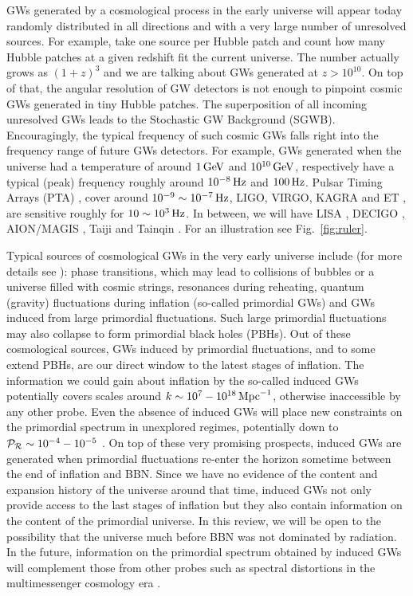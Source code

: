 \documentclass[a4paper,11pt]{article}
\numberwithin{equation}{section}
\begin{document}
GWs generated by a cosmological process in the early universe will appear today randomly distributed in all directions and with a very large number of unresolved sources. For example, take one source per Hubble patch and count how many Hubble patches at a given redshift fit the current universe. The number actually grows as $(1+z)^3$ and we are talking about GWs generated at $z>10^{10}$. On top of that, the angular resolution of GW detectors is not enough to pinpoint cosmic GWs generated in tiny Hubble patches. The superposition of all incoming unresolved GWs leads to the Stochastic GW Background (SGWB). Encouragingly, the typical frequency of such cosmic GWs falls right into the frequency range of future GWs detectors. For example, GWs generated when the universe had a temperature of around $1\,{\rm GeV}$ and $10^{10}\,{\rm GeV}$, respectively have a typical (peak) frequency roughly around $10^{-8}\,{\rm Hz}$ and $100\,{\rm Hz}$. Pulsar Timing Arrays (PTA) \cite{Lentati:2015qwp,Shannon:2015ect,Arzoumanian:2015liz,Qin:2018yhy,Aggarwal:2018mgp,Arzoumanian:2020vkk}, cover around $10^{-9}\sim10^{-7}\,{\rm Hz}$,  LIGO, VIRGO, KAGRA and ET \cite{Maggiore:2019uih}, are sensitive roughly for $10\sim10^3\,{\rm Hz}$. In between, we will have LISA \cite{Audley:2017drz,Barausse:2020rsu}, DECIGO \cite{Seto:2001qf,Yagi:2011wg,Kawamura:2020pcg}, AION/MAGIS \cite{Badurina:2019hst}, Taiji \cite{Guo:2018npi} and Tainqin \cite{Luo:2015ght}. For an illustration see Fig.~\ref{fig:ruler}.




Typical sources of cosmological GWs in the very early universe include (for more details see \cite{Caprini:2018mtu}): phase transitions, which may lead to collisions of bubbles or a universe filled with cosmic strings, resonances during reheating, quantum (gravity) fluctuations during inflation (so-called primordial GWs) and GWs induced from large primordial fluctuations. Such large primordial fluctuations may also collapse to form primordial black holes (PBHs). Out of these cosmological sources, GWs induced by primordial fluctuations, and to some extend PBHs, are our direct window to the latest stages of inflation. The information we could gain about inflation by the so-called induced GWs potentially covers scales around $k\sim 10^7-10^{18}\,{\rm Mpc}^{-1}$, otherwise inaccessible by any other probe. Even the absence of induced GWs will place new constraints on the primordial spectrum in unexplored regimes, potentially down to ${\cal P}_{\cal R}\sim 10^{-4}-10^{-5}$ \cite{Gow:2020bzo}. On top of these very promising prospects, induced GWs are generated when primordial fluctuations re-enter the horizon sometime between the end of inflation and BBN. Since we have no evidence of the content and expansion history of the universe around that time, induced GWs not only provide access to the last stages of inflation but they also contain information on the content of the primordial universe. In this review, we will be open to the possibility that the universe much before BBN was not dominated by radiation. In the future, information on the primordial spectrum obtained by induced GWs will complement those from other probes such as spectral distortions \cite{Chluba:2019kpb,Kite:2020uix} in the multimessenger cosmology era \cite{Unal:2020mts}.
\end{document}
